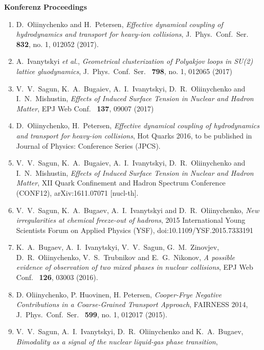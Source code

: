 \begin{lebenslauf}
\textbf{Konferenz Proceedings}

\begin{enumerate}
    \item D.~Oliinychenko and H.~Petersen,
          \emph{Effective dynamical coupling of hydrodynamics and transport for heavy-ion
           collisions},
          J.\ Phys.\ Conf.\ Ser.\  \textbf{ 832}, no. 1, 012052 (2017).
    \item A.~Ivanytskyi \textit{et al.},
          \emph{Geometrical clusterization of Polyakjov loops in SU(2) lattice gluodynamics},
          J.\ Phys.\ Conf.\ Ser.\  \textbf{ 798}, no. 1, 012065 (2017)
    \item V.~V.~Sagun, K.~A.~Bugaiev, A.~I.~Ivanytskyi, D.~R.~Oliinychenko and I.~N.~Mishustin,
          \emph{Effects of Induced Surface Tension in Nuclear and Hadron Matter},
          EPJ Web Conf.\ \textbf{ 137}, 09007 (2017)
    \item D.~Oliinychenko, H.~Petersen,
          \emph{Effective dynamical coupling of hydrodynamics and transport for heavy-ion
                collisions},
          Hot Quarks 2016, to be published in Journal of Physics: Conference Series (JPCS).
    \item V.~V.~Sagun, K.~A.~Bugaiev, A.~I.~Ivanytskyi, D.~R.~Oliinychenko and I.~N.~Mishustin,
          \emph{Effects of Induced Surface Tension in Nuclear and Hadron Matter},
          XII Quark Confinement and Hadron Spectrum Conference (CONF12), arXiv:1611.07071
          [nucl-th].
    \item V.~V.~Sagun, K.~A.~Bugaev, A.~I.~Ivanytskyi and D.~R.~Oliinychenko,
          \emph{New irregularities at chemical freeze-out of hadrons},
          2015 International Young Scientists Forum on Applied Physics (YSF),
          doi:10.1109/YSF.2015.7333191
    \item K.~A.~Bugaev, A.~I.~Ivanytskyi, V.~V.~Sagun, G.~M.~Zinovjev, D.~R.~Oliinychenko,
          V.~S.~Trubnikov and E.~G.~Nikonov,
          \emph{A possible evidence of observation of two mixed phases in nuclear collisions},
          EPJ Web Conf.\  \textbf{ 126}, 03003 (2016).
    \item D. Oliinychenko, P. Huovinen, H. Petersen,
          \emph{Cooper-Frye Negative Contributions in a Coarse-Grained Transport Approach},
          FAIRNESS 2014, J.\ Phys.\ Conf.\ Ser.\  \textbf{ 599}, no. 1, 012017 (2015).    
    \item V.~V.~Sagun, A.~I.~Ivanytskyi, D.~R.~Oliinychenko and K.~A.~Bugaev,
          \emph{Bimodality as a signal of the nuclear liquid-gas phase transition},

\end{enumerate}
\end{lebenslauf}
